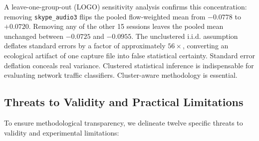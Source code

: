\documentclass[conference]{IEEEtran}
\begin{document}
A leave-one-group-out (LOGO) sensitivity analysis confirms this concentration: removing \texttt{skype\_audio3} flips the pooled flow-weighted mean from $-0.0778$ to $+0.0720$. Removing any of the other 15 sessions leaves the pooled mean unchanged between $-0.0725$ and $-0.0955$. The unclustered i.i.d. assumption deflates standard errors by a factor of approximately $56\times$, converting an ecological artifact of one capture file into false statistical certainty. Standard error deflation conceals real variance. Clustered statistical inference is indispensable for evaluating network traffic classifiers. Cluster-aware methodology is essential.

\subsection{Threats to Validity and Practical Limitations}
To ensure methodological transparency, we delineate twelve specific threats to validity and experimental limitations:
\end{document}
